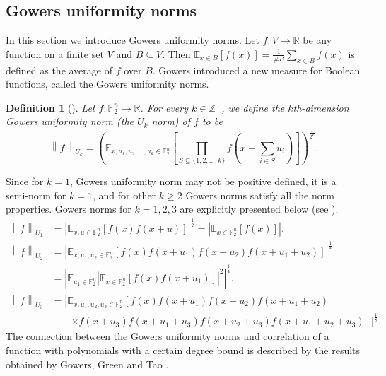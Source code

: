 \documentclass[12 pt]{article}
\newtheorem{definition}{Definition}
\def\E{{\mathbb E}}
\def\F{{\mathbb F}}
\begin{document}
\subsection{Gowers uniformity norms}
  In this section we introduce Gowers uniformity norms. 
  Let $f : V \rightarrow \mathbb{R}$ be any function on a finite set $V$ and $B \subseteq V$. 
  Then $\E_{x\in B}\left[ f(x) \right]=\frac{1}{\#B}\sum_{x\in B}f(x)$ is defined as the average of $f$ over $B$. 
  Gowers \cite{GOW01} introduced a new measure for Boolean functions, called the Gowers uniformity norms. 
  \begin{definition}[{\cite[Definition 2.2.1]{CHEN}}]
    Let $f:\F_2^n\rightarrow\mathbb{R}$. 
    For every $k\in\mathbb{Z}^+$, we define the $k$th-dimension Gowers uniformity norm (the $U_k$ norm) of $f$ to be
    \begin{equation*}
      \left\lVert f \right\rVert_{U_k}=\left( \E_{x,u_1,u_2,\ldots,u_k\in\F_2^n}
      \left[ \prod_{S\subseteq\{1,2,\ldots,k\}} f\left( x+\sum_{i\in S}u_i \right) \right] \right)^{\frac{1}{2^k}}.
    \end{equation*}
  \end{definition}
  Since for $k=1$, Gowers uniformity norm may not be positive defined, it is a semi-norm for $k=1$, and for other $k\geq2$ Gowers norms satisfy all the norm properties. 
  Gowers norms for $k = 1, 2, 3$ are explicitly presented below (see \cite{CHEN,Tao}).
  \begin{align*}
    \left\lVert f \right\rVert_{U_1} & =\left\lvert \E_{x,u\in\F_2^n}\left[f(x)f(x+u)\right]\right\rvert^{\frac{1}{2}}= \left\lvert \E_{x\in\F_2^n} \left[f(x)\right] \right\rvert.\\
    \left\lVert f \right\rVert_{U_2} & =\left\lvert \E_{x,u_1,u_2\in\F_2^n}\left[f(x)f(x+u_1)f(x+u_2)f(x+u_1+u_2)\right] \right\rvert^{\frac{1}{4}} \\
      & = \left\lvert\E_{u_1\in\F_2^n} \left\lvert\E_{x\in\F_2^n}\left[f(x)f(x+u_1)\right] \right\rvert^2 \right\rvert^{\frac{1}{4}}.\\
    \left\lVert f \right\rVert_{U_3} & =\left\lvert \E_{x,u_1,u_2,u_3\in\F_2^n}\left[f(x)f(x+u_1)f(x+u_2)f(x+u_1+u_2)\right.\right.\\
      &\qquad\left.\left.\times f(x+u_3)f(x+u_1+u_3)f(x+u_2+u_3)f(x+u_1+u_2+u_3)\right]\right\rvert^{\frac{1}{8}}.
  \end{align*}
  The connection between the Gowers uniformity norms and correlation of a function with polynomials with a certain degree bound is described by the results obtained by Gowers, Green and Tao \cite{GOW01,GT06}. 
\end{document}
